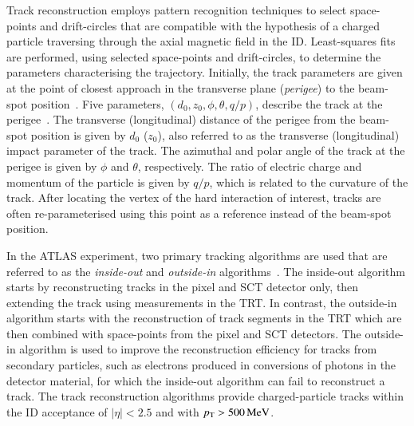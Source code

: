 Track reconstruction employs pattern recognition techniques to select
space-points and drift-circles that are compatible with the hypothesis of a
charged particle traversing through the axial magnetic field in the
ID. Least-squares fits are performed, using selected space-points and
drift-circles, to determine the parameters characterising the
trajectory. Initially, the track parameters are given at the point of closest
approach in the transverse plane (\emph{perigee}) to the beam-spot
position~\cite{PERF-2015-08}. Five parameters, $(d_0, z_0, \phi, \theta, q/p)$,
describe the track at the perigee~\cite{Akesson:2006sh}. The transverse
(longitudinal) distance of the perigee from the beam-spot position is given by
$d_0$ ($z_0$), also referred to as the transverse (longitudinal) impact
parameter of the track. The azimuthal and polar angle of the track at the
perigee is given by $\phi$ and $\theta$, respectively. The ratio of electric
charge and momentum of the particle is given by $q / p$, which is related to the
curvature of the track. After locating the vertex of the hard interaction of
interest, tracks are often re-parameterised using this point as a reference
instead of the beam-spot position.

In the ATLAS experiment, two primary tracking algorithms are used that are
referred to as the \emph{inside-out} and \emph{outside-in}
algorithms~\cite{Cornelissen:2007vba,Salzburger:2015sgq,PERF-2015-08}. The
inside-out algorithm starts by reconstructing tracks in the pixel and SCT
detector only, then extending the track using measurements in the TRT. In
contrast, the outside-in algorithm starts with the reconstruction of track
segments in the TRT which are then combined with space-points from the pixel and
SCT detectors. The outside-in algorithm is used to improve the reconstruction
efficiency for tracks from secondary particles, such as electrons produced in
conversions of photons in the detector material, for which the inside-out
algorithm can fail to reconstruct a track. The track reconstruction algorithms
provide charged-particle tracks within the ID acceptance of $|\eta| < 2.5$ and
with $p_{\text{T}} > \SI{500}{\ensuremath{\text{MeV}}}$.

